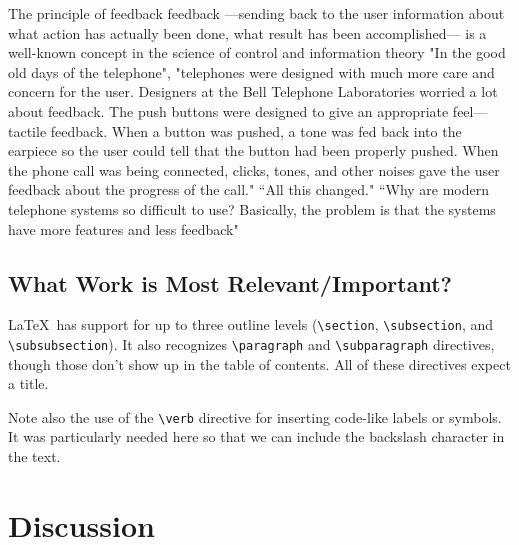 \documentclass{article}
\begin{document}
The principle of feedback
feedback ---sending back to the user information about what action has actually been done, what result has been accomplished--- is a well-known concept in the science of control and information theory\cite{Norman02} "In the good old days of the telephone", "telephones were designed with much more care and concern for the user. Designers at the Bell Telephone Laboratories worried a lot about feedback. The push buttons were designed to give an appropriate feel---tactile feedback. When a button was pushed, a tone was fed back into the earpiece so the user could tell that the button had been properly pushed. When the phone call was being connected, clicks, tones, and other noises gave the user feedback about the progress of the call." ``All this changed." ``Why are modern telephone systems so difficult to use? Basically, the problem is that the systems have more features and less feedback"

\subsection{What Work is Most Relevant/Important?}

\LaTeX\ has support for up to three outline levels (\verb!\section!, \verb!\subsection!, and \verb!\subsubsection!).  It also recognizes \verb!\paragraph! and \verb!\subparagraph! directives, though those don't show up in the table of contents.  All of these directives expect a title.

Note also the use of the \verb!\verb! directive for inserting code-like labels or symbols.  It was particularly needed here so that we can include the backslash character in the text.

\section{Discussion}
\end{document}
